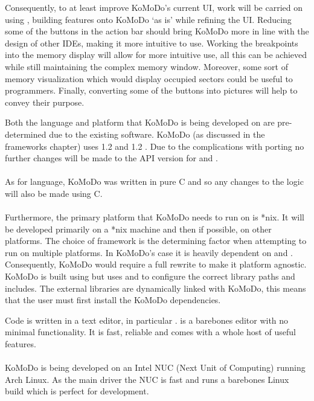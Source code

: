     Consequently, to at least improve KoMoDo's current UI, work will be carried on using , building features onto KoMoDo `as is' while refining the UI. Reducing some of the buttons in the action bar should bring KoMoDo more in line with the design of other IDEs, making it more intuitive to use. Working the breakpoints into the memory display will allow for more intuitive use, all this can be achieved while still maintaining the complex memory window. Moreover, some sort of memory visualization which would display occupied sectors could be useful to programmers. Finally, converting some of the buttons into pictures will help to convey their purpose.

  Both the language and platform that KoMoDo is being developed on are pre-determined due to the existing software. KoMoDo (as discussed in the frameworks chapter) uses  1.2 and  1.2 . Due to the complications with porting no further changes will be made to the API version for  and .\\\\
  As for language, KoMoDo was written in pure C and so any changes to the logic will also be made using C.\\\\
  Furthermore, the primary platform that KoMoDo needs to run on is *nix. It will be developed primarily on a *nix machine and then if possible, on other platforms. The choice of framework is the determining factor when attempting to run on multiple platforms. In KoMoDo's case it is heavily dependent on  and . Consequently, KoMoDo would require a full rewrite to make it platform agnostic.
  KoMoDo is built using  but uses  and  to configure the correct library paths and includes. The external libraries are dynamically linked with KoMoDo, this means that the user must first install the KoMoDo dependencies.

  Code is written in a text editor, in particular .  is a barebones editor with no minimal functionality. It is fast, reliable and comes with a whole host of useful features.\\\\
  KoMoDo is being developed on an Intel NUC (Next Unit of Computing) running Arch Linux. As the main driver the NUC is fast and runs a barebones Linux build which is perfect for development.


